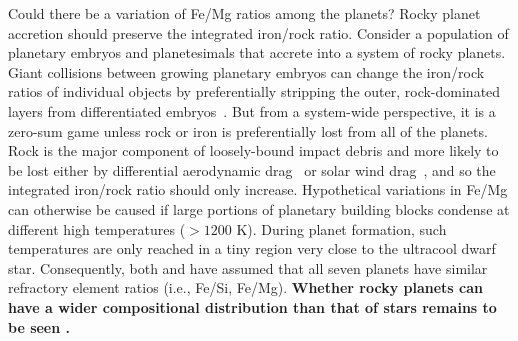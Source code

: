 \documentclass[twocolumn]{aastex63}
\begin{document}
Could there be a variation of Fe/Mg ratios among the planets?
Rocky planet accretion should preserve the integrated iron/rock ratio. Consider a population of planetary embryos and planetesimals that accrete into a system of rocky planets. Giant collisions between growing planetary embryos can change the iron/rock ratios of individual objects by preferentially stripping the outer, rock-dominated layers from differentiated embryos~\citep[e.g.][]{benz88,marcus10,asphaug14}. But from a system-wide perspective, it is a zero-sum game unless rock or iron is preferentially lost from all of the planets. Rock is the major component of loosely-bound impact debris and more likely to be lost either by differential aerodynamic drag~\citep{weidenschilling77} or solar wind drag~\citep{spalding20}, and so the integrated iron/rock ratio should only increase.
Hypothetical variations in Fe/Mg can otherwise be caused if large portions of planetary building blocks condense at different high temperatures (${>} 1200$ K). During planet formation, such temperatures are only reached in a tiny region very close to the ultracool dwarf star. Consequently, both \citet{Unterborn2018a} and \citet{Dorn2018} have assumed that all seven planets have similar refractory element ratios (i.e., Fe/Si, Fe/Mg). \textbf{Whether rocky planets can have a wider compositional distribution than that of stars remains to be seen \citep{Plotnykov2020}.}


\end{document}
